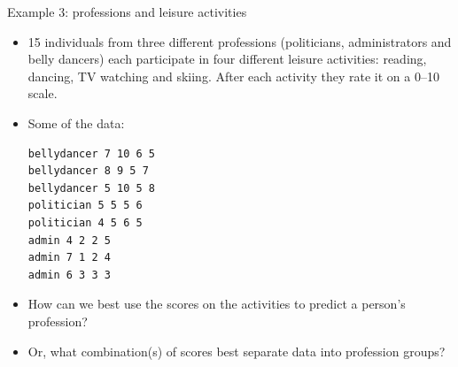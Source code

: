 \documentclass[unknownkeysallowed]{beamer}\usepackage[]{graphicx}\usepackage[]{color}
\begin{document}
\begin{frame}[fragile]{Example 3: professions and leisure activities}

  \begin{itemize}
  \item 15 individuals from three different professions (politicians,
    administrators and belly dancers) each participate in four
    different leisure activities: reading, dancing, TV watching and
    skiing. After each activity they rate it on a 0--10 scale.
  \item Some of the data:

\begin{verbatim}
bellydancer 7 10 6 5
bellydancer 8 9 5 7
bellydancer 5 10 5 8
politician 5 5 5 6
politician 4 5 6 5
admin 4 2 2 5
admin 7 1 2 4
admin 6 3 3 3
\end{verbatim}
  \item How can we best use the scores on the activities to predict a person's profession?
  \item Or, what combination(s) of scores best separate data into profession groups?
  \end{itemize}

\end{frame}
\end{document}
